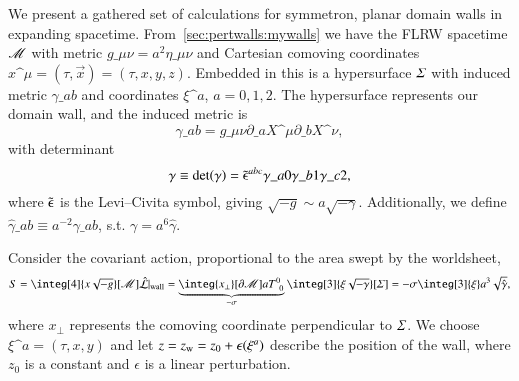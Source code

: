 





\newcommand\hypsurf{\ALIAShypsurf}
\newcommand\pert{\ALIASpert}
\newcommand\sppt{\ALIASsppt}







We present a gathered set of calculations for symmetron, planar domain walls in expanding spacetime. From~\cref{sec:pertwalls:mywalls} we have the FLRW spacetime $\mathscr{M}$ with metric $g\_{\mu\nu}=a^2 \eta\_{\mu\nu}$ and Cartesian comoving coordinates $x\^\mu = (\tau, \vec{x})=(\tau, x,y,z)$. Embedded in this is a hypersurface $\hypsurf$ with induced metric $\gamma\_{ab}$ and coordinates $\xi\^a$, $a=0,1,2$. %
The hypersurface represents our domain wall, and the induced metric is
\begin{equation}
    \gamma\_{ab} = g\_{\mu\nu} \partial\_{a} X\^\mu \partial\_{b} X\^\nu,
\end{equation}
with determinant
\begin{equation}
    \gamma \equiv \det(\gamma) = \tilde{\epsilonup}\^{abc}\gamma\_{a0}\gamma\_{b1}\gamma\_{c2},
\end{equation}
where $\tilde{\epsilonup}$ is the Levi--Civita symbol, 
giving $\sqrt{-g}\sim a\sqrt{-\gamma}$. Additionally, we define $\hat{\gamma}\_{ab} \equiv a^{-2}\gamma\_{ab}$, s.t. $\gamma =a^6 \hat{\gamma}$.


Consider the covariant action, proportional to the area swept by the worldsheet,
\begin{equation}\label{eq:walls:covariant_action}
    S = \integ[4]{x\sqrt{-g}}[\Manifold] \hat{\mathcal{L}}\rvert\ped{wall} = \underbrace{\integ{x_\bot}[\partial \Manifold] aT\iud{0}{0}}_{-\sigma} \integ[3]{\xi \sqrt{-\gamma}}[\hypsurf] = -\sigma \integ[3]{\xi}a^3 \sqrt{\hat{\gamma}},
\end{equation}
where $x_\bot$ represents the comoving coordinate perpendicular to $\hypsurf$. %
We choose $\xi\^a = (\tau, x, y)$ and let $z=z\ped{w}=z_0 + \epsilon(\xi\^a)$ describe the position of the wall, where $z_0$ is a constant and $\epsilon$ is a linear perturbation. 

